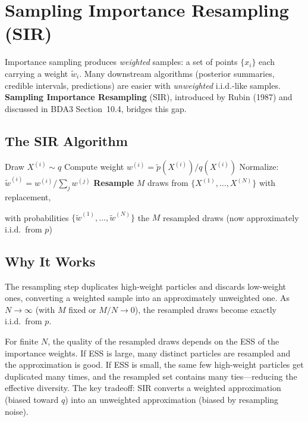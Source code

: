 \documentclass[11pt]{article}
\begin{document}
\section{Sampling Importance Resampling (SIR)}

Importance sampling produces \emph{weighted} samples: a set of points $\{x_i\}$ each carrying a weight $\tilde{w}_i$.  Many downstream algorithms (posterior summaries, credible intervals, predictions) are easier with \emph{unweighted} i.i.d.-like samples.  \textbf{Sampling Importance Resampling} (SIR), introduced by Rubin (1987) and discussed in BDA3 Section~10.4, bridges this gap.

\subsection{The SIR Algorithm}

\begin{algorithm}[H]
\caption{Sampling Importance Resampling (SIR)}
\label{alg:sir}
\begin{algorithmic}[1]
  \State Draw $X^{(i)} \sim q$ 
  \State Compute weight $w^{(i)} = \tilde{p}(X^{(i)}) / q(X^{(i)})$
\EndFor
\State Normalize: $\tilde{w}^{(i)} = w^{(i)} / \sum_j w^{(j)}$
\State \textbf{Resample} $M$ draws from $\{X^{(1)}, \ldots, X^{(N)}\}$ with replacement, \par with probabilities $\{\tilde{w}^{(1)}, \ldots, \tilde{w}^{(N)}\}$
\State \Return the $M$ resampled draws (now approximately i.i.d.\ from $p$)
\end{algorithmic}
\end{algorithm}

\subsection{Why It Works}

The resampling step duplicates high-weight particles and discards low-weight ones, converting a weighted sample into an approximately unweighted one.  As $N \to \infty$ (with $M$ fixed or $M/N \to 0$), the resampled draws become exactly i.i.d.\ from $p$.

For finite $N$, the quality of the resampled draws depends on the ESS of the importance weights.  If ESS is large, many distinct particles are resampled and the approximation is good.  If ESS is small, the same few high-weight particles get duplicated many times, and the resampled set contains many ties---reducing the effective diversity.  The key tradeoff: SIR converts a weighted approximation (biased toward $q$) into an unweighted approximation (biased by resampling noise).
\end{document}
